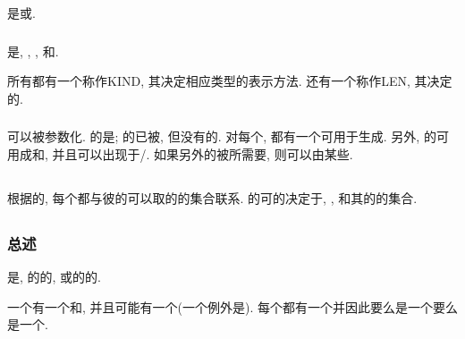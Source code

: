 \Type{}是\Intrinsic{}\Type{}或\DerivedType{}.

\subsubsection{\Intrinsic{}\Type{}}

\Intrinsic{}\Type{}是\IntegerType{}, \RealType{}, \ComplexType{}, \CharacterType{}和\LogicalType{}.

所有\Intrinsic{}\Type{}都有一个\Kind{}\TypeParameter{}称作KIND, 其决定相应类型的表示方法. \CharacterType{}还有一个\Length{}\TypeParameter{}称作LEN, 其决定\CharacterString{}的\Length{}.

\subsubsection{\DerivedType{}}

\DerivedType{}可以被参数化. \DerivedType{}的\Scalar{}\Object{}是\Structure{}; \Structure{}的\Assignment{}已被\Intrinsically{}\Define{}, 但没有\Structure{}的\Intrinsic{}\Operation{}. 对每个\DerivedType{}, 都有一个\StructureConstructor{}可用于生成\Value{}. 另外, \DerivedType{}的\Object{}可用成\Procedure{}\Argument{}和\Function{}\Result{}, 并且可以出现于\Input{}/\Output{}\List{}. 如果另外的\Operation{}被\DerivedType{}所需要, 则可以由某些\Procedure{}\Define{}.

\subsection{\Data{}\Value{}}

根据\TypeParameter{}的\Value{}, 每个\Intrinsic{}\Type{}都与彼\Type{}的\Data{}可以取的\Value{}的集合联系. \DerivedType{}的\Object{}可\Assume{}的\Value{}决定于\Type{}\Define{}, \TypeParameter{}\Value{}, 和其\Component{}的\Value{}的集合.

\subsection{\Data{}\Entity{}}

\subsubsection{总述}

\Data{}\Entity{}是\Data{}\Object{}, \Expression{}的\Evaluation{}的\Result{}, 或\Function{}\Reference{}的\Execution{}的\Result{}.

一个\Data{}\Entity{}有一个\Type{}和\TypeParameter{}, 并且可能有一个\Data{}\Value{}(一个例外是\Undefined{}\Variable{}). 每个\Data{}\Entity{}都有一个\Rank{}并因此要么是一个\Scalar{}要么是一个\Array{}.

